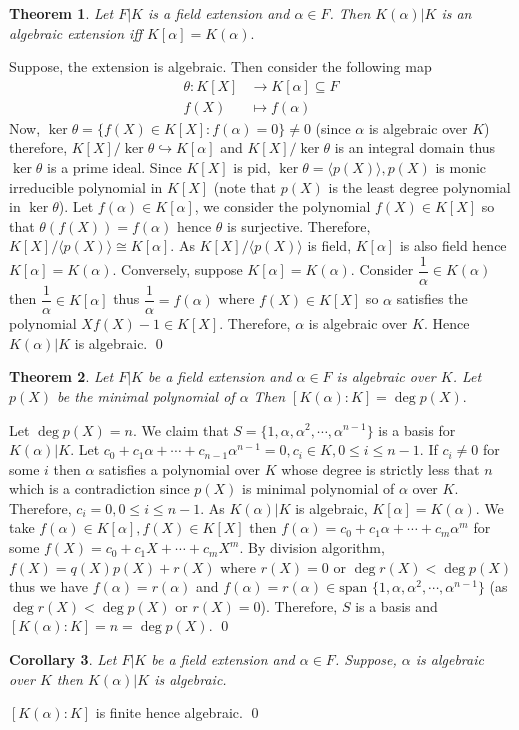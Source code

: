 \documentclass[11pt]{amsart}
\newtheorem{theorem}{Theorem}[section]
\newtheorem{corollary}[theorem]{Corollary}%
\newcommand{\gen}[1]{\langle#1\rangle}
\newcommand{\Span}[1]{\text{span~}\{#1\}}
\begin{document}
\begin{theorem}
Let $F|K$ is a field extension and $\alpha\in F$. Then $K(\alpha)|K$ is an algebraic extension iff $K[\alpha]=K(\alpha).$
\end{theorem}
\proof Suppose, the extension is algebraic. Then consider the following map \begin{align*}
\theta:K[X]&\to K[\alpha]\subseteq F\\
f(X)&\mapsto f(\alpha)
\end{align*}
Now, $\ker\theta=\{f(X)\in K[X]:f(\alpha)=0\}\neq 0$ (since $\alpha$ is algebraic over $K$) therefore, $K[X]/\ker\theta\hookrightarrow K[\alpha]$ and $K[X]/\ker\theta$ is an integral domain thus $\ker\theta$ is a prime ideal. Since $K[X]$ is pid, $\ker\theta=\gen{p(X)},p(X)$ is monic irreducible polynomial in $K[X]$ (note that $p(X)$ is the least degree polynomial in $\ker\theta$). Let $f(\alpha)\in K[\alpha]$, we consider the polynomial $f(X)\in K[X]$ so that $\theta(f(X))=f(\alpha)$ hence $\theta$ is surjective. Therefore, $K[X]/\gen{p(X)}\cong K[\alpha].$ As $K[X]/\gen{p(X)}$ is field, $K[\alpha]$ is also field hence $K[\alpha]=K(\alpha).$ Conversely, suppose $K[\alpha]=K(\alpha).$ Consider $\dfrac{1}{\alpha}\in K(\alpha)$ then $\dfrac{1}{\alpha}\in K[\alpha]$ thus $\dfrac{1}{\alpha}=f(\alpha)$ where $f(X)\in K[X]$ so $\alpha$ satisfies the polynomial $Xf(X)-1\in K[X].$ Therefore, $\alpha$ is algebraic over $K$. Hence $K(\alpha)|K$ is algebraic. \qed

\begin{theorem}
Let $F|K$ be a field extension and $\alpha\in F$ is algebraic over $K$. Let $p(X)$ be the minimal polynomial of $\alpha$ Then $[K(\alpha):K]=\deg p(X).$
\end{theorem}
\proof Let $\deg p(X)=n$. We claim that $S=\{1,\alpha,\alpha^2,\cdots,\alpha^{n-1}\}$ is a basis for $K(\alpha)|K.$ Let $c_0+c_1\alpha+\cdots+c_{n-1}\alpha^{n-1}=0,c_i\in K,0\leq i\leq n-1.$ If $c_i\neq 0$ for some $i$ then $\alpha$ satisfies a polynomial over $K$ whose degree is strictly less that $n$ which is a contradiction since $p(X)$ is minimal polynomial of $\alpha$ over $K$. Therefore, $c_i=0,0\leq i\leq n-1.$ As $K(\alpha)|K$ is algebraic, $K[\alpha]=K(\alpha)$. We take $f(\alpha)\in K[\alpha],f(X)\in K[X]$ then $f(\alpha)=c_0+c_1\alpha+\cdots+c_m\alpha^m$ for some $f(X)=c_0+c_1X+\cdots+c_mX^m.$ By division algorithm, $f(X)=q(X)p(X)+r(X)$ where $r(X)=0$ or $\deg r(X)<\deg p(X)$ thus we have $f(\alpha)=r(\alpha)$ and $f(\alpha)=r(\alpha)\in \Span{1,\alpha,\alpha^2,\cdots,\alpha^{n-1}}$ (as $\deg r(X)<\deg p(X)$ or $r(X)=0$). Therefore, $S$ is a basis and $[K(\alpha):K]=n=\deg p(X).$ \qed
\begin{corollary}
Let $F|K$ be a field extension and $\alpha\in F$. Suppose, $\alpha$ is algebraic over $K$ then $K(\alpha)|K$ is algebraic.
\end{corollary}
\proof $[K(\alpha):K]$ is finite hence algebraic. \qed
\end{document}
